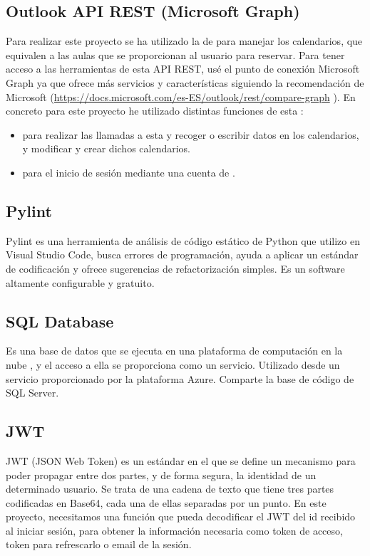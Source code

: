 \subsection{Outlook API REST (Microsoft Graph) }
Para realizar este proyecto se ha utilizado la  de  para manejar los calendarios, que equivalen a las aulas que se proporcionan al usuario para reservar. Para tener acceso a las herramientas de esta API REST, usé el punto de conexión Microsoft Graph ya que ofrece más servicios y características siguiendo la recomendación de Microsoft (\url{https://docs.microsoft.com/es-ES/outlook/rest/compare-graph} \cite{microsoftGraph}).
En concreto para este proyecto he utilizado distintas funciones de esta :
\begin{itemize}
    \item {} para realizar las llamadas a esta  y recoger o escribir datos en los calendarios, y modificar y crear dichos calendarios.
    \item {} para el inicio de sesión mediante una cuenta de .
\end{itemize}

\subsection{Pylint}
Pylint es una herramienta de análisis de código estático de Python que utilizo en Visual Studio Code, busca errores de programación, ayuda a aplicar un estándar de codificación y ofrece sugerencias de refactorización simples. Es un software altamente configurable y gratuito.\cite{pylint}

\subsection{SQL Database}
Es una base de datos que se ejecuta en una plataforma de computación en la nube , y el acceso a ella se proporciona como un servicio. Utilizado desde un servicio proporcionado por la plataforma Azure. Comparte la base de código de SQL Server.\cite{wiki:sqldatabase}

\subsection{JWT} 
JWT (JSON Web Token) es un estándar en el que se define un mecanismo para poder propagar entre dos partes, y de forma segura, la identidad de un determinado usuario. Se trata de una cadena de texto que tiene tres partes codificadas en Base64, cada una de ellas separadas por un punto. En este proyecto, necesitamos una función que pueda decodificar el JWT del id recibido al iniciar sesión, para obtener la información necesaria como token de acceso, token para refrescarlo o email de la sesión.\cite{JWT}


